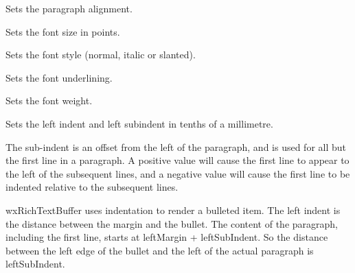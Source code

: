 
Sets the paragraph alignment.

\label{wxrichtextattrsetfontsize}


Sets the font size in points.

\label{wxrichtextattrsetfontstyle}


Sets the font style (normal, italic or slanted).

\label{wxrichtextattrsetfontunderlined}


Sets the font underlining.

\label{wxrichtextattrsetfontweight}


Sets the font weight.

\label{wxrichtextattrsetleftindent}


Sets the left indent and left subindent in tenths of a millimetre.

The sub-indent is an offset from the left of the paragraph, and is used for all but the
first line in a paragraph. A positive value will cause the first line to appear to the left
of the subsequent lines, and a negative value will cause the first line to be indented
relative to the subsequent lines.

wxRichTextBuffer uses indentation to render a bulleted item. The left indent is the distance between
the margin and the bullet. The content of the paragraph, including the first line, starts
at leftMargin + leftSubIndent. So the distance between the left edge of the bullet and the
left of the actual paragraph is leftSubIndent.

\label{wxrichtextattrsetlinespacing}


